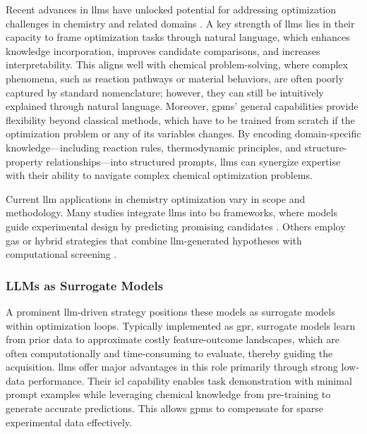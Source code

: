 Recent advances in \glspl{llm} have unlocked potential for addressing optimization challenges in chemistry and related domains \autocite{fernando2023promptbreeder0, yang2023large, chen2024instruct}. 
A key strength of \glspl{llm} lies in their capacity to frame optimization tasks through natural language, which enhances knowledge incorporation, improves candidate comparisons, and increases interpretability. 
This aligns well with chemical problem-solving, where complex phenomena, such as reaction pathways or material behaviors, are often poorly captured by standard nomenclature; however, they can still be intuitively explained through natural language. 
Moreover, \glspl{gpm}' general capabilities provide flexibility beyond classical methods, which have to be trained from scratch if the optimization problem or any of its variables changes.
By encoding domain-specific knowledge---including reaction rules, thermodynamic principles, and structure-property relationships---into structured prompts, \glspl{llm} can synergize expertise with their ability to navigate complex chemical optimization problems.

Current \gls{llm} applications in chemistry optimization vary in scope and methodology. 
Many studies integrate \glspl{llm} into \gls{bo} frameworks, where models guide experimental design by predicting promising candidates \autocite{rankovic2023bochemian}. Others employ \glspl{ga} or hybrid strategies that combine \gls{llm}-generated hypotheses with computational screening \autocite{cisse2025language0based}.  

\subsubsection{LLMs as Surrogate Models}

A prominent \gls{llm}-driven strategy positions these models as surrogate models within optimization loops. Typically implemented as \gls{gpr}, surrogate models learn from prior data to approximate costly feature-outcome landscapes, which are often computationally and time-consuming to evaluate, thereby guiding the acquisition.
\glspl{llm} offer major advantages in this role primarily through strong low-data performance. 
Their \gls{icl} capability enables task demonstration with minimal prompt examples while leveraging chemical knowledge from pre-training to generate accurate predictions. 
This allows \glspl{gpm} to compensate for sparse experimental data effectively.

